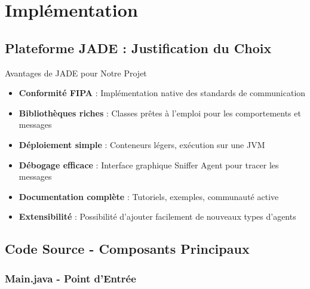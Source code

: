 \documentclass[12pt,a4paper]{article}
\begin{document}
\section{Implémentation}

\subsection{Plateforme JADE : Justification du Choix}

\begin{infobox}{Avantages de JADE pour Notre Projet}
\begin{itemize}[leftmargin=*]
    \item \textbf{Conformité FIPA} : Implémentation native des standards de communication
    \item \textbf{Bibliothèques riches} : Classes prêtes à l'emploi pour les comportements et messages
    \item \textbf{Déploiement simple} : Conteneurs légers, exécution sur une JVM
    \item \textbf{Débogage efficace} : Interface graphique Sniffer Agent pour tracer les messages
    \item \textbf{Documentation complète} : Tutoriels, exemples, communauté active
    \item \textbf{Extensibilité} : Possibilité d'ajouter facilement de nouveaux types d'agents
\end{itemize}
\end{infobox}

\subsection{Code Source - Composants Principaux}

\subsubsection{Main.java - Point d'Entrée}
\end{document}
